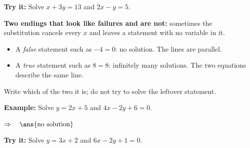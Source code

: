 \documentclass[12pt]{article}
\begin{document}
\begin{tryitbox}
\textbf{Try it:} \quad Solve $x + 3y = 13$ and $2x - y = 5$.\\[2pt]
\end{tryitbox}


\begin{formulabox}
\textbf{Two endings that look like failures and are not:} sometimes the substitution cancels every
$x$ and leaves a statement with no variable in it.
\begin{itemize}[leftmargin=0.75cm, itemsep=1pt, topsep=2pt]
  \item A \emph{false} statement such as $-4 = 0$: no solution. The lines are parallel.
  \item A \emph{true} statement such as $8 = 8$: infinitely many solutions. The two equations
        describe the same line.
\end{itemize}
Write which of the two it is; do not try to solve the leftover statement.
\end{formulabox}

\begin{examplebox}
\textbf{Example:} \quad Solve $y = 2x + 5$ and $4x - 2y + 6 = 0$.

$\Rightarrow\quad \ans{\text{no solution}}$
\end{examplebox}

\begin{tryitbox}
\textbf{Try it:} \quad Solve $y = 3x + 2$ and $6x - 2y + 1 = 0$.\\[2pt]
\end{tryitbox}
\end{document}
